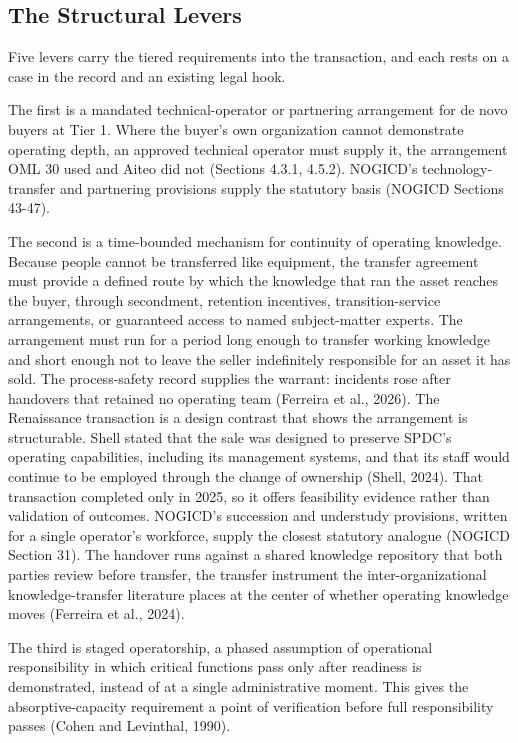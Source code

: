 \documentclass[twoside,fontset=lmodern]{mitthesis}
\begin{document}
\hypertarget{the-structural-levers}{%
\subsection{The Structural Levers}\label{the-structural-levers}}

Five levers carry the tiered requirements into the transaction, and each
rests on a case in the record and an existing legal hook.

The first is a mandated technical-operator or partnering arrangement for
de novo buyers at Tier 1. Where the buyer's own organization cannot
demonstrate operating depth, an approved technical operator must supply
it, the arrangement OML 30 used and Aiteo did not (Sections 4.3.1,
4.5.2). NOGICD's technology-transfer and partnering provisions supply
the statutory basis (NOGICD Sections 43-47).

The second is a time-bounded mechanism for continuity of operating
knowledge. Because people cannot be transferred like equipment, the
transfer agreement must provide a defined route by which the knowledge
that ran the asset reaches the buyer, through secondment, retention
incentives, transition-service arrangements, or guaranteed access to
named subject-matter experts. The arrangement must run for a period long
enough to transfer working knowledge and short enough not to leave the
seller indefinitely responsible for an asset it has sold. The
process-safety record supplies the warrant: incidents rose after
handovers that retained no operating team (Ferreira et al., 2026). The
Renaissance transaction is a design contrast that shows the arrangement
is structurable. Shell stated that the sale was designed to preserve
SPDC's operating capabilities, including its management systems, and
that its staff would continue to be employed through the change of
ownership (Shell, 2024). That transaction completed only in 2025, so it
offers feasibility evidence rather than validation of outcomes. NOGICD's
succession and understudy provisions, written for a single operator's
workforce, supply the closest statutory analogue (NOGICD Section 31).
The handover runs against a shared knowledge repository that both
parties review before transfer, the transfer instrument the
inter-organizational knowledge-transfer literature places at the center
of whether operating knowledge moves (Ferreira et al., 2024).

The third is staged operatorship, a phased assumption of operational
responsibility in which critical functions pass only after readiness is
demonstrated, instead of at a single administrative moment. This gives
the absorptive-capacity requirement a point of verification before full
responsibility passes (Cohen and Levinthal, 1990).
\end{document}
